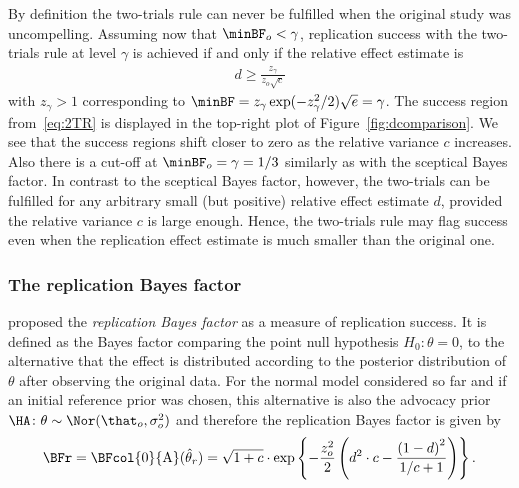 By definition the two-trials rule can never be fulfilled when the original study
was uncompelling. Assuming now that $\minBF_{o} < \gamma$, replication success
with the two-trials rule at level $\gamma$ is achieved if and only if the
relative effect estimate is
\begin{align}
  \label{eq:2TR}
  d \geq \frac{z_{\gamma}}{z_{o} \sqrt{c}}
\end{align}
with $z_{\gamma} > 1$ corresponding to
$\minBF = z_{\gamma}\exp(-z_{\gamma}^{2}/2)\sqrt{e} = \gamma$. The success
region from~\eqref{eq:2TR} is displayed in the top-right plot of
Figure~\ref{fig:dcomparison}. We see that the success regions shift closer to
zero as the relative variance $c$ increases. Also there is a cut-off at
$\minBF_{o} = \gamma = 1/3$ similarly as with the sceptical Bayes factor. In
contrast to the sceptical Bayes factor, however, the two-trials can be fulfilled
for any arbitrary small (but positive) relative effect estimate $d$, provided
the relative variance $c$ is large enough. Hence, the two-trials rule may flag
success even when the replication effect estimate is much smaller than the
original one.

\subsubsection{The replication Bayes factor}
\citet{Verhagen2014} proposed the \emph{replication Bayes factor} as a measure
of replication success. It is defined as the Bayes factor comparing the point
null hypothesis $H_0 \colon \theta = 0$, to the alternative that the effect is
distributed according to the posterior distribution of $\theta$ after observing
the original data. For the normal model considered so far and if an initial
reference prior was chosen, this alternative is also the advocacy prior
$\HA \colon \theta \sim \Nor(\that_o, \sigma^2_o)$ and therefore the replication
Bayes factor is given by
\begin{align}
  \label{eq:BFrep}
  \BFr
  = \BFcol{\mathrm{0}}{\mathrm{A}}(\hat{\theta}_r)
  = \sqrt{1 + c} \cdot
  \exp\left\{-\frac{z_o^2}{2} \left(d^2 \cdot c -
  \frac{\left(1 - d\right)^2}{1/c + 1} \right)\right\}.
\end{align}

